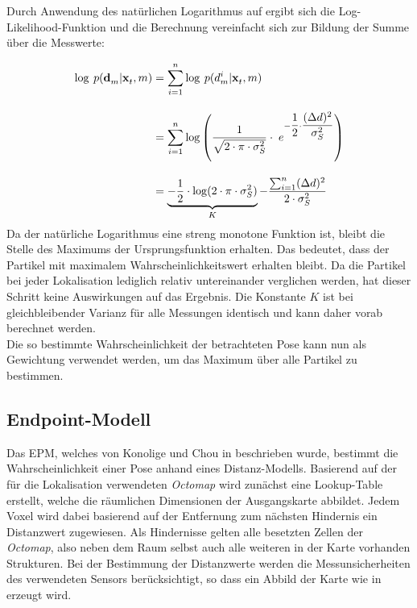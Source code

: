 Durch Anwendung des natürlichen Logarithmus auf  ergibt sich die Log-Likelihood-Funktion und die Berechnung vereinfacht sich zur Bildung der Summe über die Messwerte:

\begin{equation}
\begin{split}
\log \: p(\mathbf{d}^{}_{m}|\mathbf{x}^{}_{t},m) & = \sum_{i=1}^{n}\log\: p(d_m^i|\mathbf{x}^{}_{t},m) \\[1em]
& = \sum_{i=1}^{n}\log \left( \frac{1}{\sqrt{2 \cdot \pi \cdot \sigma_S^2}} \cdot \; e^{-\dfrac{1}{2} \cdot \dfrac{{(\Delta d})^2}{\sigma_S^2}} \right)\\[1em]
& = \underbrace{-\frac{1}{2} \cdot \log(2 \cdot \pi \cdot\sigma_S^2)}_K-\dfrac{\sum_{i=1}^{n}(\Delta d)^2}{2 \cdot \sigma_S^2}
\end{split}
\end{equation}
Da der natürliche Logarithmus eine streng monotone Funktion ist, bleibt die Stelle des Maximums der Ursprungsfunktion erhalten. Das bedeutet, dass der Partikel mit maximalem Wahrscheinlichkeitswert erhalten bleibt. Da die Partikel bei jeder Lokalisation lediglich relativ untereinander verglichen werden, hat dieser Schritt keine Auswirkungen auf das Ergebnis. Die Konstante $K$ ist bei gleichbleibender Varianz für alle Messungen identisch und kann daher vorab berechnet werden.\\
Die so bestimmte Wahrscheinlichkeit der betrachteten Pose kann nun als Gewichtung verwendet werden, um das Maximum über alle Partikel zu bestimmen. 

\subsection{Endpoint-Modell}
Das EPM, welches von Konolige und Chou in \cite{Konolige1999} beschrieben wurde, bestimmt die Wahrscheinlichkeit einer Pose anhand eines Distanz-Modells. Basierend auf der für die Lokalisation verwendeten \textit{Octomap} wird zunächst eine Lookup-Table erstellt, welche die räumlichen Dimensionen der Ausgangskarte abbildet. Jedem Voxel wird dabei basierend auf der Entfernung zum nächsten Hindernis ein Distanzwert zugewiesen. Als Hindernisse gelten alle besetzten Zellen der \textit{Octomap}, also neben dem Raum selbst auch alle weiteren in der Karte vorhanden Strukturen. Bei der Bestimmung der Distanzwerte werden die Messunsicherheiten des verwendeten Sensors berücksichtigt, so dass ein Abbild der Karte wie in  erzeugt wird.

